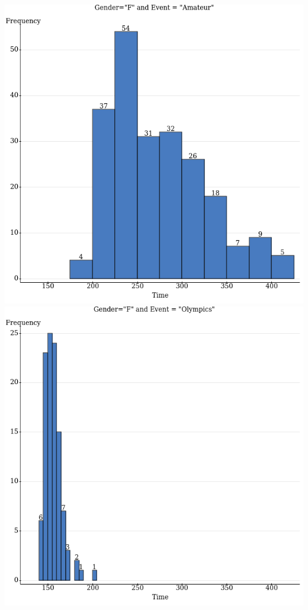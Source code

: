 \documentclass[../mathNotesPreamble]{subfiles}
\begin{document}
    \begin{center}
      \includegraphics[width=0.45\linewidth]{images/math211_3p4_female_marathon_amateur_times}
      \includegraphics[width=0.45\linewidth]{images/math211_3p4_female_marathon_olympic_times}
    \end{center}

  \pagebreak
\end{document}

